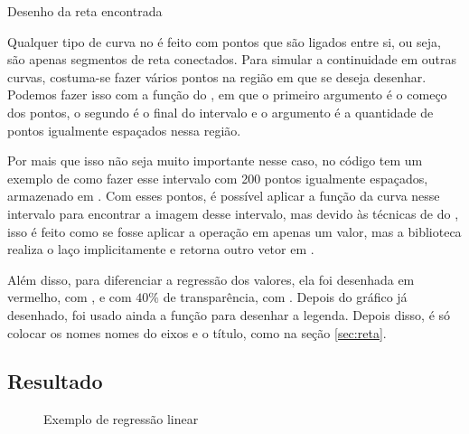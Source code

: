     \begin{listing}[H]
        \caption{Desenho da reta encontrada}
        \label{code:regres:plot}

    \end{listing}

    Qualquer tipo de curva no \matplotlib é feito com pontos que são ligados entre si, ou seja, são apenas segmentos de reta conectados. Para simular a continuidade em outras curvas, costuma-se fazer vários pontos na região em que se deseja desenhar. Podemos fazer isso com a função  do \numpy, em que o primeiro argumento é o começo dos pontos, o segundo é o final do intervalo e o argumento  é a quantidade de pontos igualmente espaçados nessa região.

    Por mais que isso não seja muito importante nesse caso, no código tem um exemplo de como fazer esse intervalo com 200 pontos igualmente espaçados, armazenado em . Com esses pontos, é possível aplicar a função da curva nesse intervalo para encontrar a imagem desse intervalo, mas devido às técnicas de  do \numpy, isso é feito como se fosse aplicar a operação em apenas um valor, mas a biblioteca realiza o laço implicitamente e retorna outro vetor em .

    Além disso, para diferenciar a regressão dos valores, ela foi desenhada em vermelho, com , e com $40\%$ de transparência, com . Depois do gráfico já desenhado, foi usado ainda a função  para desenhar a legenda. Depois disso, é só colocar os nomes nomes do eixos e o título, como na seção \ref{sec:reta}.


\subsection{Resultado}

    \begin{figure}[H]
        \centering
        

        \caption{Exemplo de regressão linear}
        \label{fig:regres:resultado}
    \end{figure}
